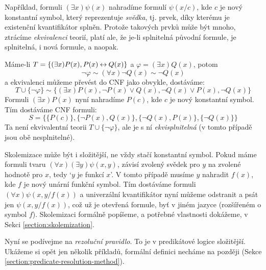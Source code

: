 Například, formuli $(\exists x)\psi(x)$ nahradíme formulí $\psi(x/c)$, kde $c$ je nový konstantní symbol, který reprezentuje \emph{svědka}, tj. prvek, díky kterému je existenční kvantifikátor splněn. Protože takových prvků může být mnoho, ztrácíme \emph{ekvivalenci} teorií, platí ale, že je-li splnitelná původní formule, je splnitelná, i nová formule, a naopak.

\begin{example}
  Máme-li $T=\{(\exists x)P(x),P(x)\mathbin{\leftrightarrow} Q(x)\}$ a $\varphi=(\exists x)Q(x)$, potom
  $$
  \neg\varphi\sim(\forall x)\neg Q(x)\sim\neg Q(x)
  $$
  a ekvivalenci můžeme převést do CNF jako obvykle, dostáváme:
  $$
  T\cup\{\neg \varphi\}\sim\{(\exists x)P(x),\neg P(x)\lor Q(x),\neg Q(x)\lor P(x),\neg Q(x)\}
  $$
  Formuli $(\exists x)P(x)$ nyní nahradíme $P(c)$, kde $c$ je nový konstantní symbol. Tím dostáváme CNF formuli:
  $$
  S = \{\{P(c)\},\{\neg P(x),Q(x)\},\{\neg Q(x),P(x)\},\{\neg Q(x)\}\}
  $$
  Ta není ekvivalentní teorii $T\cup\{\neg \varphi\}$, ale je s ní \emph{ekvisplnitelná} (v tomto případě jsou obě nesplnitelné).
\end{example}

Skolemizace může být i složitější, ne vždy stačí konstantní symbol. Pokud máme formuli tvaru $(\forall x)(\exists y)\psi(x,y)$, závisí zvolený svědek pro $y$ na zvolené hodnotě pro $x$, tedy `$y$ je funkcí $x$'. V tomto případě musíme $y$ nahradit $f(x)$, kde $f$ je nový unární funkční symbol. Tím dostáváme formuli $(\forall x)\psi(x,y/f(x))$ a univerzální kvantifikátor nyní můžeme odstranit a psát jen $\psi(x,y/f(x))$, což už je otevřená formule, byť v jiném jazyce (rozšířeném o symbol $f$). Skolemizaci formálně popíšeme, a potřebné vlastnosti dokážeme, v Sekci \ref{section:skolemization}.

Nyní se podívejme na \emph{rezoluční pravidlo}. To je v predikátové logice složitější. Ukážeme si opět jen několik příkladů, formální definici necháme na později (Sekce \ref{section:predicate-resolution-method}).

